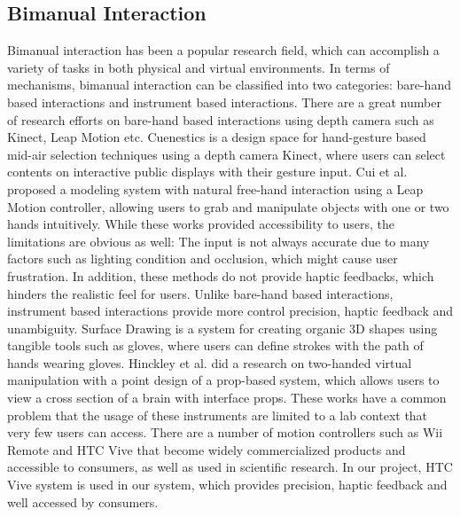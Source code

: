 \subsection{Bimanual Interaction}
\label{sec:2.1}
Bimanual interaction has been a popular research field, which can accomplish a variety of tasks in both physical and virtual environments. In terms of mechanisms, bimanual interaction can be classified into two categories: bare-hand based interactions and instrument based interactions. There are a great number of research efforts \cite{walter2014cuenesics,cui2016exploration,ramani2015gesture,murugappan2013handy,han2014virtual} on bare-hand based interactions using depth camera such as Kinect, Leap Motion etc. Cuenestics \cite{walter2014cuenesics} is a design space for hand-gesture based mid-air selection techniques using a depth camera Kinect, where users can select contents on interactive public displays with their gesture input. Cui et al. \cite{cui2016exploration} proposed a modeling system with natural free-hand interaction using a Leap Motion controller, allowing users to grab and manipulate objects with one or two hands intuitively. While these works provided accessibility to users, the limitations are obvious as well: The input is not always accurate due to many factors such as lighting condition and occlusion, which might cause user frustration. In addition, these methods do not provide haptic feedbacks, which hinders the realistic feel for users. Unlike bare-hand based interactions, instrument based interactions provide more control precision, haptic feedback and unambiguity. Surface Drawing \cite{schkolne2001surface} is a system for creating organic 3D shapes using tangible tools such as gloves, where users can define strokes with the path of hands wearing gloves. Hinckley et al. \cite{hinckley1998two} did a research on two-handed virtual manipulation with a point design of a prop-based system, which allows users to view a cross section of a brain with interface props. These works have a common problem that the usage of these instruments are limited to a lab context that very few users can access. There are a number of motion controllers such as Wii Remote \cite{wingcrave2010wii} and HTC Vive \cite{niehorster2017accuracy} that become widely commercialized products and accessible to consumers, as well as used in scientific research. In our project, HTC Vive system is used in our system, which provides precision, haptic feedback and well accessed by consumers.

